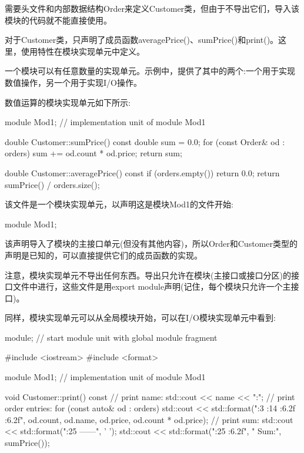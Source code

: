 需要头文件和内部数据结构Order来定义Customer类，但由于不导出它们，导入该模块的代码就不能直接使用。

对于Customer类，只声明了成员函数averagePrice()、sumPrice()和print()。这里，使用特性在模块实现单元中定义。


一个模块可以有任意数量的实现单元。示例中，提供了其中的两个:一个用于实现数值操作，另一个用于实现I/O操作。

数值运算的模块实现单元如下所示:


\begin{cpp}
module Mod1; // implementation unit of module Mod1

double Customer::sumPrice() const
{
	double sum = 0.0;
	for (const Order& od : orders) {
		sum += od.count * od.price;
	}
	return sum;
}

double Customer::averagePrice() const
{
	if (orders.empty()) {
		return 0.0;
	}
	return sumPrice() / orders.size();
}
\end{cpp}

该文件是一个模块实现单元，以声明这是模块Mod1的文件开始:

\begin{cpp}
module Mod1;
\end{cpp}

该声明导入了模块的主接口单元(但没有其他内容)，所以Order和Customer类型的声明是已知的，可以直接提供它们的成员函数的实现。

注意，模块实现单元不导出任何东西。导出只允许在模块(主接口或接口分区)的接口文件中进行，这些文件是用export module声明(记住，每个模块只允许一个主接口)。

同样，模块实现单元可以从全局模块开始，可以在I/O模块实现单元中看到:


\begin{cpp}
module; // start module unit with global module fragment

#include <iostream>
#include <format>

module Mod1; // implementation unit of module Mod1

void Customer::print() const
{
	// print name:
	std::cout << name << ":\n";
	// print order entries:
	for (const auto& od : orders) {
		std::cout << std::format("{:3} {:14} {:6.2f} {:6.2f}\n",
								  od.count, od.name, od.price, od.count * od.price);
	}
	// print sum:
	std::cout << std::format("{:25} ------\n", ' ');
	std::cout << std::format("{:25} {:6.2f}\n", " Sum:", sumPrice());
}
\end{cpp}

